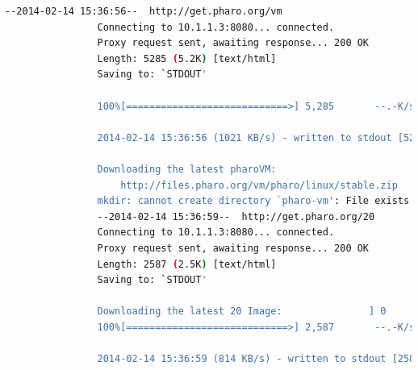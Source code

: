 \documentclass[a4paper,10pt,twoside]{book}
\begin{document}
			\begin{lstlisting}[language=bash,title={Installing donatello - Output}]
				--2014-02-14 15:36:56--  http://get.pharo.org/vm
				Connecting to 10.1.1.3:8080... connected.
				Proxy request sent, awaiting response... 200 OK
				Length: 5285 (5.2K) [text/html]
				Saving to: `STDOUT'

				100%[============================>] 5,285       --.-K/s   in 0.005s  

				2014-02-14 15:36:56 (1021 KB/s) - written to stdout [5285/5285]

				Downloading the latest pharoVM:
					http://files.pharo.org/vm/pharo/linux/stable.zip
				mkdir: cannot create directory `pharo-vm': File exists
				--2014-02-14 15:36:59--  http://get.pharo.org/20
				Connecting to 10.1.1.3:8080... connected.
				Proxy request sent, awaiting response... 200 OK
				Length: 2587 (2.5K) [text/html]
				Saving to: `STDOUT'

				Downloading the latest 20 Image:               ] 0           --.-K/s              
				100%[============================>] 2,587       --.-K/s   in 0.003s  

				2014-02-14 15:36:59 (814 KB/s) - written to stdout [2587/2587]


\end{lstlisting}
\end{document}
